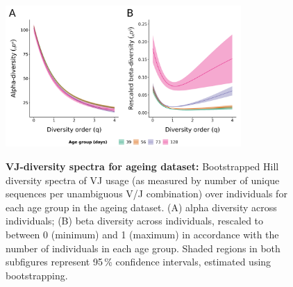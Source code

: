 \begin{figure}
\centering
\includegraphics[width = 0.8\textwidth]{_Figures/png/ageing-VJ-diversity-alpha-beta}
\begin{subfigure}{0em}
\label{fig:igseq-ageing-VJ-diversity-alpha}
\end{subfigure}
\begin{subfigure}{0em}
\label{fig:igseq-ageing-VJ-diversity-beta}
\end{subfigure}
\caption[VJ-diversity spectra for \igseq ageing dataset]{\textbf{VJ-diversity spectra for \igseq ageing dataset:} Bootstrapped Hill diversity spectra of VJ usage (as measured by number of unique sequences per unambiguous V/J combination) over individuals for each age group in the \igseq ageing dataset. (A) alpha diversity across individuals; (B) beta diversity across individuals, rescaled to between 0 (minimum) and 1 (maximum) in accordance with the number of individuals in each age group. Shaded regions in both subfigures represent 95\,\% confidence intervals, estimated using bootstrapping.}
\label{fig:igseq-ageing-VJ-diversity-spectra}
\end{figure}

